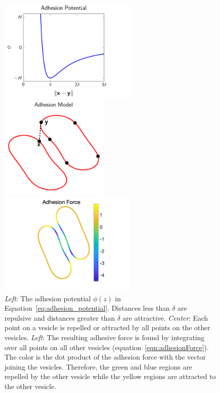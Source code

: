 \documentclass[prf,superscriptaddress,showpacs]{revtex4-1}
\begin{document}
\begin{figure}[htp]
  \begin{minipage}{0.31\textwidth}
    \centering
    \includegraphics[height=5cm,trim={0cm 0cm 2cm 0cm},clip]{figs/adhesionPotential.pdf}
  \end{minipage}
  \hfill
  \begin{minipage}{0.31\textwidth}
    \centering
    \includegraphics[height=5cm]{figs/configCartoon.pdf}
  \end{minipage}
  \hfill
  \begin{minipage}{0.31\textwidth}
    \centering
    \includegraphics[height=5cm,trim={3cm 0cm 2cm 0cm},clip]{figs/Adhesion_Force.png}
  \end{minipage}
  \caption{\label{fig:adhesionModel} {\em Left}: The adhesion potential
  $\phi(z)$ in Equation~\eqref{eq:adhesion_potential}.  Distances less
  than $\delta$ are repulsive and distances greater than $\delta$ are
  attractive.  {\em Center}: Each point on a vesicle is repelled or
  attracted by all points on the other vesicles.  {\em Left}: The
  resulting adhesive force is found by integrating over all points on
  all other vesicles (equation~\eqref{eqn:adhesionForce}).  The color is
  the dot product of the adhesion force with the vector joining the
  vesicles.  Therefore, the green and blue regions are repelled by the
  other vesicle while the yellow regions are attracted to the other
  vesicle.}
\end{figure}
\end{document}
